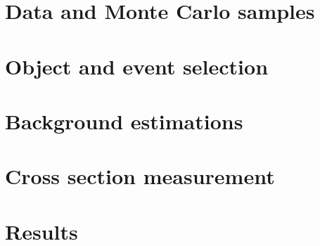 \section{Data and Monte Carlo samples}\label{ssww13tev:data_mc}


\section{Object and event selection}\label{ssww13tev:object_event_selection}


%

\section{Background estimations}\label{ssww13tev:background}


\section{Cross section measurement}\label{ssww13tev:xsec}


\section{Results}\label{ssww13tev:results}

